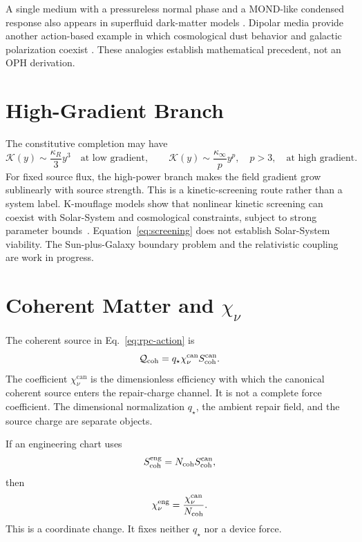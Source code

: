 \documentclass[11pt]{article}
\newcommand{\chican}{\chi_\nu^{\mathrm{can}}}
\begin{document}
A single medium with a pressureless normal phase and a MOND-like condensed
response also appears in superfluid dark-matter models
\cite{berezhiani2015}. Dipolar media provide another action-based example in
which cosmological dust behavior and galactic polarization coexist
\cite{blanchet2008}. These analogies establish mathematical precedent, not an
OPH derivation.

\section{High-Gradient Branch}

The constitutive completion may have
\begin{equation}
\mathcal K(y)\sim\frac{\kappa_R}{3}y^3
\quad\text{at low gradient},
\qquad
\mathcal K(y)\sim\frac{\kappa_\infty}{p}y^p,
\quad p>3,
\quad\text{at high gradient}.
\label{eq:screening}
\end{equation}
For fixed source flux, the high-power branch makes the field gradient grow
sublinearly with source strength. This is a kinetic-screening route rather
than a system label. K-mouflage models show that nonlinear kinetic screening
can coexist with Solar-System and cosmological constraints, subject to strong
parameter bounds~\cite{barreira2015}. Equation~\eqref{eq:screening} does not
establish Solar-System viability. The Sun-plus-Galaxy boundary problem and the
relativistic coupling are work in progress.

\section{Coherent Matter and \texorpdfstring{\(\chi_\nu\)}{chi-nu}}

The coherent source in Eq.~\eqref{eq:rpc-action} is
\begin{equation}
\mathcal Q_{\rm coh}=q_\star\chican S_{\rm coh}^{\rm can}.
\label{eq:coherent-charge}
\end{equation}
The coefficient \(\chican\) is the dimensionless efficiency with which the
canonical coherent source enters the repair-charge channel. It is not a
complete force coefficient. The dimensional normalization \(q_\star\), the
ambient repair field, and the source charge are separate objects.

If an engineering chart uses
\begin{equation}
S_{\rm coh}^{\rm eng}=N_{\rm coh}S_{\rm coh}^{\rm can},
\end{equation}
then
\begin{equation}
\chi_\nu^{\rm eng}=\frac{\chican}{N_{\rm coh}}.
\end{equation}
This is a coordinate change. It fixes neither \(q_\star\) nor a device force.
\end{document}
